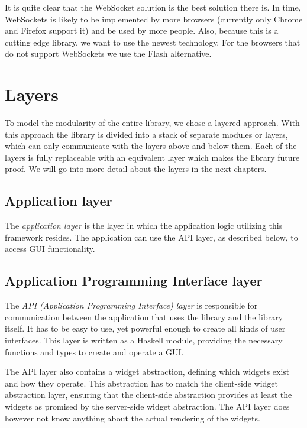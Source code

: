 \documentclass[11pt,a4paper]{article}
\begin{document}
\newpage
It is quite clear that the WebSocket solution is the best solution there is.
In time, WebSockets is likely to be implemented by more browsers (currently only Chrome and Firefox support it) and be used by more people.
Also, because this is a cutting edge library, we want to use the newest technology.
For the browsers that do not support WebSockets we use the Flash alternative.

\newpage
\section{Layers}

To model the modularity of the entire library, we chose a layered approach.
With this approach the library is divided into a stack of separate modules or layers, which can only communicate with the layers above and below them.
Each of the layers is fully replaceable with an equivalent layer which makes the library future proof.
We will go into more detail about the layers in the next chapters.

\subsection{Application layer}
The \textit{application layer} is the layer in which the application logic utilizing this framework resides.
The application can use the API layer, as described below, to access GUI functionality.

\subsection{Application Programming Interface layer}

The \textit{API (Application Programming Interface) layer} is responsible for communication between the application that uses the library and the library itself.
It has to be easy to use, yet powerful enough to create all kinds of user interfaces.
This layer is written as a Haskell module, providing the necessary functions and types to create and operate a GUI.

The API layer also contains a widget abstraction, defining which widgets exist and how they operate.
This abstraction has to match the client-side widget abstraction layer, ensuring that the client-side abstraction provides at least the widgets as promised by the server-side widget abstraction.
The API layer does however not know anything about the actual rendering of the widgets.
\end{document}
